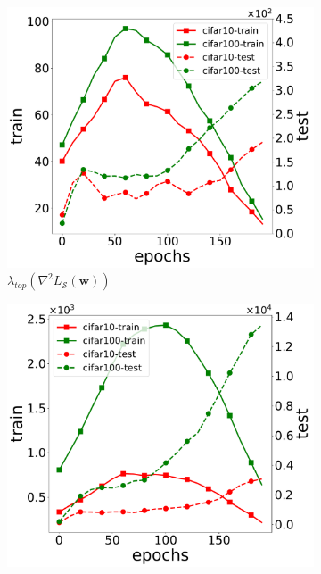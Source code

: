 \documentclass[letterpaper]{article} %
\theoremstyle{plain}
\theoremstyle{definition}
\begin{document}
\begin{figure}[ht!]
   \centering
   \begin{subfigure}{0.45\textwidth}
     \centering
     \includegraphics[width=\textwidth]{figs/top_eigen.pdf}
     \caption{$\lambda_{top}\left(\nabla^2 L_{\mathcal{S}}\left(\boldsymbol{w}\right)\right)$}
     \label{subfig:top_eigen}
   \end{subfigure}
   \hspace{0.01\textwidth}
   \begin{subfigure}{0.45\textwidth}
     \centering
     \includegraphics[width=\textwidth]{figs/trace.pdf}

\end{subfigure}
\end{figure}
\end{document}
